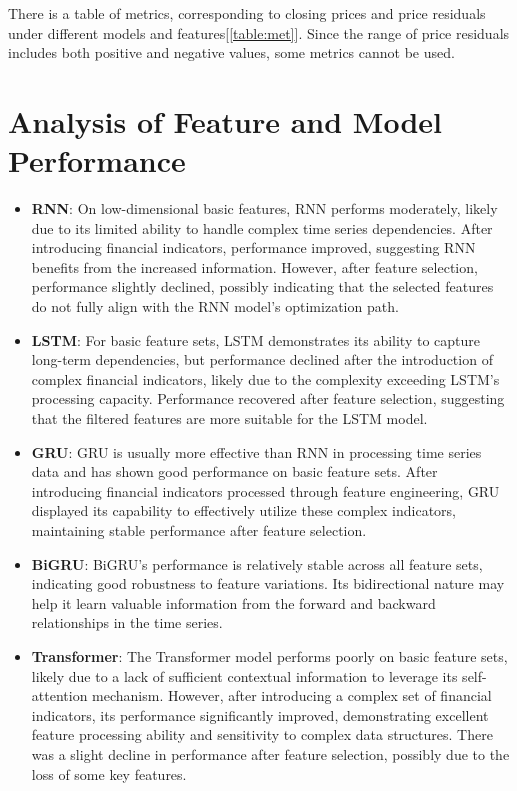 \documentclass[10pt,twocolumn,letterpaper]{article}
\begin{document}
There is a table of metrics, corresponding to closing prices and price residuals under different models and features[\ref{table:met}]. Since the range of price residuals includes both positive and negative values, some metrics cannot be used.
\section{Analysis of Feature and Model Performance}
\label{sec:ra}

\begin{itemize}
    \item \textbf{RNN}: On low-dimensional basic features, RNN performs moderately, likely due to its limited ability to handle complex time series dependencies. After introducing financial indicators, performance improved, suggesting RNN benefits from the increased information. However, after feature selection, performance slightly declined, possibly indicating that the selected features do not fully align with the RNN model's optimization path.
    
    \item \textbf{LSTM}: For basic feature sets, LSTM demonstrates its ability to capture long-term dependencies, but performance declined after the introduction of complex financial indicators, likely due to the complexity exceeding LSTM's processing capacity. Performance recovered after feature selection, suggesting that the filtered features are more suitable for the LSTM model.
    
    \item \textbf{GRU}: GRU is usually more effective than RNN in processing time series data and has shown good performance on basic feature sets. After introducing financial indicators processed through feature engineering, GRU displayed its capability to effectively utilize these complex indicators, maintaining stable performance after feature selection.
    
    \item \textbf{BiGRU}: BiGRU's performance is relatively stable across all feature sets, indicating good robustness to feature variations. Its bidirectional nature may help it learn valuable information from the forward and backward relationships in the time series.
    
    \item \textbf{Transformer}: The Transformer model performs poorly on basic feature sets, likely due to a lack of sufficient contextual information to leverage its self-attention mechanism. However, after introducing a complex set of financial indicators, its performance significantly improved, demonstrating excellent feature processing ability and sensitivity to complex data structures. There was a slight decline in performance after feature selection, possibly due to the loss of some key features.
\end{itemize}
\end{document}
